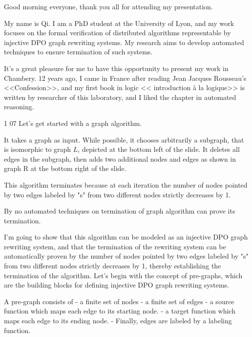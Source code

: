 Good morning everyone, thank you all for attending my presentation.

My name is Qi. I am a PhD student at the University of Lyon, and my work focuses on the formal verification of distributed algorithms representable by injective DPO graph rewriting systems. My research aims to develop automated techniques to ensure termination of such systems.

It's a great pleasure for me to have this opportunity to present my work in Chambery. 12 years ago, I came in France after reading Jean Jacques Rousseau's <<Confession>>, and my first book in logic << introduction à la logique>> is written by researcher of this laboratory, and I liked the chapter in automated reasoning. 



1 07
Let's get started with a graph algorithm. 

It takes a graph as input. 
While possible, it chooses arbitrarily a subgraph, that is isomorphic to graph $L$, depicted at the bottom left of the slide.
It deletes all edges in the subgraph, then adds two additional nodes and edges as shown in graph R at the bottom right of the slide.

This algorithm terminates because at each iteration the number of nodes pointed by two edges labeled by "s" from two different nodes strictly decreases by 1. 

By no automated techniques on termination of graph algorithm can prove its termination.

I'm going to show that this algorithm can be modeled as an injective DPO graph rewriting system, and that the termination of the rewriting system can be automatically proven by the number of nodes pointed by two edges labeled by "s" from two different nodes strictly decreases by 1, thereby establishing the termination of the algorithm. 
Let's begin with the concept of pre-graphs, which are the building blocks for defining injective DPO graph rewriting systems.

A pre-graph consists of 
    - a finite set of nodes 
    - a finite set of edges
    - a source function which maps each edge to its starting node.
    - a target function which maps each edge to its ending node.
    - Finally, edges are labeled by a labeling function.

